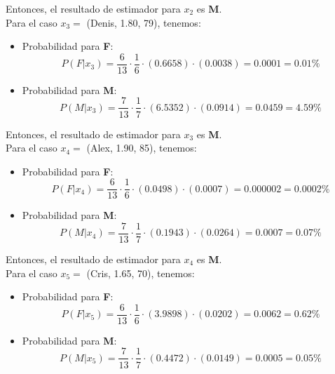 \documentclass[letterpaper,12pt]{article}
\theoremstyle{definition}
\begin{document}
Entonces, el resultado de estimador para \(x_2\) es \textbf{M}.\\

Para el caso \(x_3 = \) (Denis, 1.80, 79), tenemos:\\
\begin{itemize}
  \item Probabilidad para \textbf{F}:
  \begin{equation}
    P(F|x_3) = \frac{6}{13}  \cdot \frac{1}{6} \cdot (0.6658) \cdot (0.0038) = 0.0001 = 0.01\%
  \end{equation}
  \item Probabilidad para \textbf{M}: 
  \begin{equation}
    P(M|x_3) = \frac{7}{13}  \cdot \frac{1}{7} \cdot (6.5352) \cdot (0.0914) = 0.0459 = 4.59\%
  \end{equation}
\end{itemize}
\medskip

Entonces, el resultado de estimador para \(x_3\) es \textbf{M}.\\

Para el caso \(x_4 = \) (Alex, 1.90, 85), tenemos:\\
\begin{itemize}
  \item Probabilidad para \textbf{F}:
  \begin{equation}
    P(F|x_4) = \frac{6}{13}  \cdot \frac{1}{6} \cdot (0.0498) \cdot (0.0007) = 0.000002 = 0.0002\%
  \end{equation}
  \item Probabilidad para \textbf{M}: 
  \begin{equation}
    P(M|x_4) = \frac{7}{13}  \cdot \frac{1}{7} \cdot (0.1943) \cdot (0.0264) = 0.0007 = 0.07\%
  \end{equation}
\end{itemize}
\medskip

Entonces, el resultado de estimador para \(x_4\) es \textbf{M}.\\

Para el caso \(x_5 = \) (Cris, 1.65, 70), tenemos:\\
\begin{itemize}
  \item Probabilidad para \textbf{F}:
  \begin{equation}
    P(F|x_5) = \frac{6}{13}  \cdot \frac{1}{6} \cdot (3.9898) \cdot (0.0202) = 0.0062 = 0.62\%
  \end{equation}
  \item Probabilidad para \textbf{M}: 
  \begin{equation}
    P(M|x_5) = \frac{7}{13}  \cdot \frac{1}{7} \cdot (0.4472) \cdot (0.0149) = 0.0005 = 0.05\%
  \end{equation}
\end{itemize}
\medskip
\end{document}
